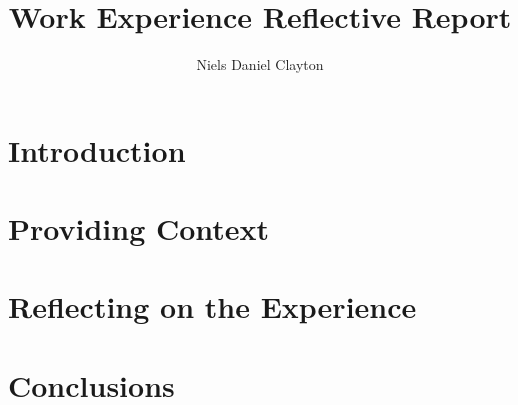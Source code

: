 \documentclass[11pt, a4paper, twoside, openright]{report}
\title{Work Experience Reflective Report}
\author{Niels Daniel Clayton}
\date{}
\begin{document}
\begin{abstract}

\end{abstract}


\frontmatter


\maketitle


\tableofcontents



\mainmatter


\section{Introduction}

\section{Providing Context}

\section{Reflecting on the Experience}

\section{Conclusions}
\end{document}
